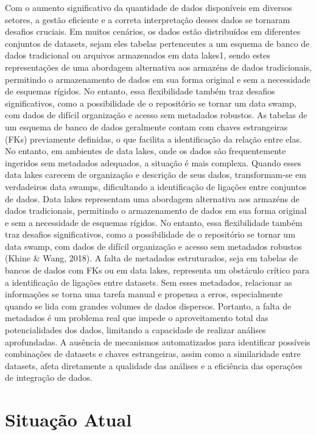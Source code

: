 \documentclass[12pt, a4paper]{article}
\begin{document}
Com o aumento significativo da quantidade de dados disponíveis em diversos setores, a gestão eficiente e a correta interpretação desses dados se tornaram desafios cruciais. 
Em muitos cenários, os dados estão distribuídos em diferentes conjuntos de datasets, sejam eles tabelas pertencentes a um esquema de banco de dados tradicional ou arquivos armazenados em data lakes1, sendo estes representações de uma abordagem alternativa aos armazéns de dados tradicionais, permitindo o armazenamento de dados em sua forma original e sem a necessidade de esquemas rígidos. 
No entanto, essa flexibilidade também traz desafios significativos, como a possibilidade de o repositório se tornar um data swamp, com dados de difícil organização e acesso sem metadados robustos. 
As tabelas de um esquema de banco de dados geralmente contam com chaves estrangeiras (FKs) previamente definidas, o que facilita a identificação da relação entre elas. 
No entanto, em ambientes de data lakes, onde os dados são frequentemente ingeridos sem metadados adequados, a situação é mais complexa. 
Quando esses data lakes carecem de organização e descrição de seus dados, transformam-se em verdadeiros data swamps, dificultando a identificação de ligações entre conjuntos de dados. 
Data lakes representam uma abordagem alternativa aos armazéns de dados tradicionais, permitindo o armazenamento de dados em sua forma original e sem a necessidade de esquemas rígidos. 
No entanto, essa flexibilidade também traz desafios significativos, como a possibilidade de o repositório se tornar um data swamp, com dados de difícil organização e acesso sem metadados robustos (Khine \& Wang, 2018). 
A falta de metadados estruturados, seja em tabelas de bancos de dados com FKs ou em data lakes, representa um obstáculo crítico para a identificação de ligações entre datasets. 
Sem esses metadados, relacionar as informações se torna uma tarefa manual e propensa a erros, especialmente quando se lida com grandes volumes de dados dispersos. 
Portanto, a falta de metadados é um problema real que impede o aproveitamento total das potencialidades dos dados, limitando a capacidade de realizar análises aprofundadas. 
A ausência de mecanismos automatizados para identificar possíveis combinações de datasets e chaves estrangeiras, assim como a similaridade entre datasets, afeta diretamente a qualidade das análises e a eficiência das operações de integração de dados. 

\newpage
\section{Situação Atual} 
\label{sec:situacao-atual}
\end{document}
